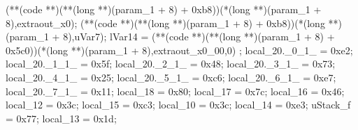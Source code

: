 \documentclass[
]{article}
\newenvironment{Shaded}{}{}
\newcommand{\BaseNTok}[1]{\textcolor[rgb]{0.25,0.63,0.44}{#1}}
\newcommand{\DataTypeTok}[1]{\textcolor[rgb]{0.56,0.13,0.00}{#1}}
\newcommand{\DecValTok}[1]{\textcolor[rgb]{0.25,0.63,0.44}{#1}}
\newcommand{\NormalTok}[1]{#1}
\newcommand{\OperatorTok}[1]{\textcolor[rgb]{0.40,0.40,0.40}{#1}}
\begin{document}
\begin{Shaded}
\begin{Highlighting}[]
  \OperatorTok{(**(}\NormalTok{code }\OperatorTok{**)(**(}\DataTypeTok{long} \OperatorTok{**)(}\NormalTok{param\_1 }\OperatorTok{+} \DecValTok{8}\OperatorTok{)} \OperatorTok{+} \BaseNTok{0xb8}\OperatorTok{))(*(}\DataTypeTok{long} \OperatorTok{**)(}\NormalTok{param\_1 }\OperatorTok{+} \DecValTok{8}\OperatorTok{),}\NormalTok{extraout\_x0}\OperatorTok{);}
  \OperatorTok{(**(}\NormalTok{code }\OperatorTok{**)(**(}\DataTypeTok{long} \OperatorTok{**)(}\NormalTok{param\_1 }\OperatorTok{+} \DecValTok{8}\OperatorTok{)} \OperatorTok{+} \BaseNTok{0xb8}\OperatorTok{))(*(}\DataTypeTok{long} \OperatorTok{**)(}\NormalTok{param\_1 }\OperatorTok{+} \DecValTok{8}\OperatorTok{),}\NormalTok{uVar7}\OperatorTok{);}
\NormalTok{  lVar14 }\OperatorTok{=} \OperatorTok{(**(}\NormalTok{code }\OperatorTok{**)(**(}\DataTypeTok{long} \OperatorTok{**)(}\NormalTok{param\_1 }\OperatorTok{+} \DecValTok{8}\OperatorTok{)} \OperatorTok{+} \BaseNTok{0x5c0}\OperatorTok{))(*(}\DataTypeTok{long} \OperatorTok{**)(}\NormalTok{param\_1 }\OperatorTok{+} \DecValTok{8}\OperatorTok{),}\NormalTok{extraout\_x0\_00}\OperatorTok{,}\DecValTok{0}\OperatorTok{)}
  \OperatorTok{;}
\NormalTok{  local\_20}\OperatorTok{.}\NormalTok{\_0\_1\_ }\OperatorTok{=} \BaseNTok{0xe2}\OperatorTok{;}
\NormalTok{  local\_20}\OperatorTok{.}\NormalTok{\_1\_1\_ }\OperatorTok{=} \BaseNTok{0x5f}\OperatorTok{;}
\NormalTok{  local\_20}\OperatorTok{.}\NormalTok{\_2\_1\_ }\OperatorTok{=} \BaseNTok{0x48}\OperatorTok{;}
\NormalTok{  local\_20}\OperatorTok{.}\NormalTok{\_3\_1\_ }\OperatorTok{=} \BaseNTok{0x73}\OperatorTok{;}
\NormalTok{  local\_20}\OperatorTok{.}\NormalTok{\_4\_1\_ }\OperatorTok{=} \BaseNTok{0x25}\OperatorTok{;}
\NormalTok{  local\_20}\OperatorTok{.}\NormalTok{\_5\_1\_ }\OperatorTok{=} \BaseNTok{0xc6}\OperatorTok{;}
\NormalTok{  local\_20}\OperatorTok{.}\NormalTok{\_6\_1\_ }\OperatorTok{=} \BaseNTok{0xe7}\OperatorTok{;}
\NormalTok{  local\_20}\OperatorTok{.}\NormalTok{\_7\_1\_ }\OperatorTok{=} \BaseNTok{0x11}\OperatorTok{;}
\NormalTok{  local\_18 }\OperatorTok{=} \BaseNTok{0x80}\OperatorTok{;}
\NormalTok{  local\_17 }\OperatorTok{=} \BaseNTok{0x7c}\OperatorTok{;}
\NormalTok{  local\_16 }\OperatorTok{=} \BaseNTok{0x46}\OperatorTok{;}
\NormalTok{  local\_12 }\OperatorTok{=} \BaseNTok{0x3c}\OperatorTok{;}
\NormalTok{  local\_15 }\OperatorTok{=} \BaseNTok{0xc3}\OperatorTok{;}
\NormalTok{  local\_10 }\OperatorTok{=} \BaseNTok{0x3c}\OperatorTok{;}
\NormalTok{  local\_14 }\OperatorTok{=} \BaseNTok{0xe3}\OperatorTok{;}
\NormalTok{  uStack\_f }\OperatorTok{=} \BaseNTok{0x77}\OperatorTok{;}
\NormalTok{  local\_13 }\OperatorTok{=} \BaseNTok{0x1d}\OperatorTok{;}

\end{Highlighting}
\end{Shaded}
\end{document}
